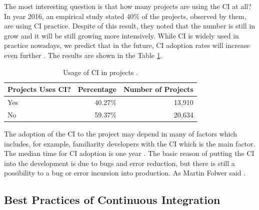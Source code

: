 The most interesting question is that how many projects are using the CI at all? In year 2016, an empirical study stated 40\% \cite{COPE} of the projects, observed by them, are using CI practice. Despite of this result, they noted that the number is still in grow and it will be still growing more intensively. While CI is widely used in practice nowadays, we predict that in the future, CI adoption rates will increase even further \cite{COPE}. The results are shown in the Table \ref{table:CI_usage}.\\

\begin{table}[H]
    \centering
    \caption{Usage of CI in projects \cite{COPE}.}
    \label{table:CI_usage}
    \begin{tabular}{lrr}
        \hline
        Projects Uses CI? & Percentage & Number of Projects \\
        \hline
        Yes               & 40.27\%    & 13,910             \\
        No                & 59.37\%    & 20,634             \\
        \hline
    \end{tabular}
\end{table}

The adoption of the CI to the project may depend in many of factors which includes, for example, familiarity developers with the CI which is the main factor. The median time for CI adoption is one year \cite{COPE}. The basic reason of putting the CI into the development is due to bugs and error reduction, but there is still a possibility to a bug or error incursion into production. As Martin Folwer said  \cite{MartinFowler}.

\subsection{Best Practices of Continuous Integration}


